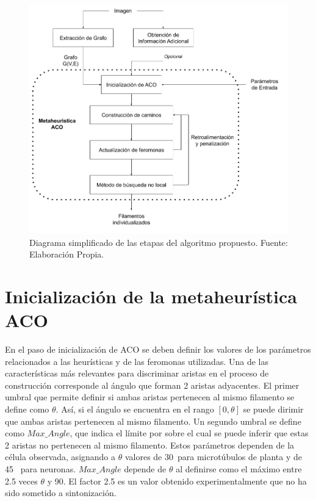 \begin{figure}[h]
    \centering
    \includegraphics[scale=0.45]{imagenes/ACOdiagram.png}
    \caption[Diagrama de las etapas del algoritmo propuesto]{Diagrama simplificado de las etapas del algoritmo propuesto. Fuente: Elaboraci\'on Propia.}
    \label{fig:ACOdiagram}
\end{figure}

\section{Inicializaci\'on de la metaheur\'istica ACO}
\label{sec:acoInit}
En el paso de inicializaci\'on de ACO se deben definir los valores de los par\'ametros relacionados a las heur\'isticas y de las feromonas utilizadas. Una de las caracter\'isticas m\'as relevantes para discriminar aristas en el proceso de construcci\'on corresponde al \'angulo que forman 2 aristas adyacentes.
El primer umbral que permite definir si ambas aristas pertenecen al mismo filamento se define como $\theta$. As\'i, si el \'angulo se encuentra en el rango $[0, \theta]$ se puede dirimir que ambas aristas pertenecen al mismo filamento. Un segundo umbral se define como $Max\_Angle$, que indica el l\'imite por sobre el cual se puede inferir que estas 2 aristas no pertenecen al mismo filamento. Estos par\'ametros dependen de la c\'elula observada, asignando a $\theta$ valores de 30\textdegree ~para microt\'ubulos de planta y de 45\textdegree~ para neuronas. $Max\_Angle$ depende de $\theta$ al definirse como el m\'aximo entre 2.5 veces $\theta$ y 90\textdegree. El factor 2.5 es un valor obtenido experimentalmente que no ha sido sometido a sintonizaci\'on.

